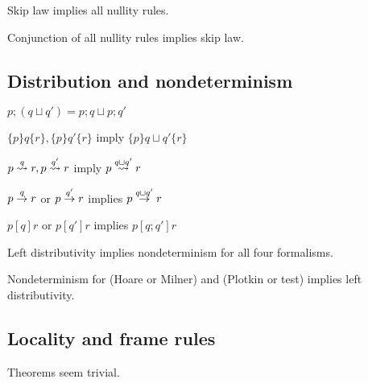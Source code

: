 \documentclass{article}
\begin{document}
\begin{theorem}
Skip law implies all nullity rules.
\end{theorem}

\begin{theorem}
Conjunction of all nullity rules implies skip law.
\end{theorem}


\subsection*{Distribution and nondeterminism}

\begin{definition}[$\sqcup$]
\end{definition}

\begin{law}
$p; (q \sqcup q') = p;q \sqcup p;q'$
\end{law}

\begin{rul}
$\{p\}q\{r\}, \{p\}q'\{r\}$ imply $\{p\}q\sqcup q'\{r\}$
\end{rul}

\begin{rul}
$p \stackrel{q}{\leadsto} r, p \stackrel{q'}{\leadsto} r$ imply $p \stackrel{q\sqcup q'}{\leadsto} r$
\end{rul}

\begin{rul}
$p \stackrel{q}{\rightarrow} r$ or $p \stackrel{q'}{\rightarrow} r$ implies $p \stackrel{q\sqcup q'}{\rightarrow} r$
\end{rul}

\begin{rul}
$p [q] r$ or $p [q'] r$ implies $p [q;q'] r$
\end{rul}

\begin{theorem}
Left distributivity implies nondeterminism for all four formalisms.
\end{theorem}


\begin{theorem}
Nondeterminism for (Hoare or Milner) and (Plotkin or test) 
implies left distributivity.
\end{theorem}


\subsection*{Locality and frame rules}
Theorems seem trivial.
\end{document}
